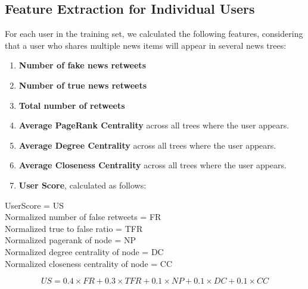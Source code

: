 \documentclass[11pt,a4paper]{article}
\begin{document}
\subsection*{Feature Extraction for Individual Users}
For each user in the training set, we calculated the following features, considering that a user who shares multiple news items will appear in several news trees:
\begin{enumerate}
    \item \textbf{Number of fake news retweets}
    \item \textbf{Number of true news retweets}
    \item \textbf{Total number of retweets}
    \item \textbf{Average PageRank Centrality} across all trees where the user appears.
    \item \textbf{Average Degree Centrality} across all trees where the user appears.
    \item \textbf{Average Closeness Centrality} across all trees where the user appears.
    \item \textbf{User Score}, calculated as follows:
    
\end{enumerate}

\begin{center}
	UserScore = US \\
	Normalized number of false retweets = FR \\
	Normalized true to false ratio = TFR \\
	Normalized pagerank of node = NP \\
	Normalized degree centrality of node = DC \\
	Normalized closeness centrality of node = CC \\
\end{center}

\begin{equation}
	US = 0.4 \times FR + 0.3 \times TFR + 0.1 \times NP + 0.1 \times DC + 0.1 \times CC
\end{equation}
\end{document}
